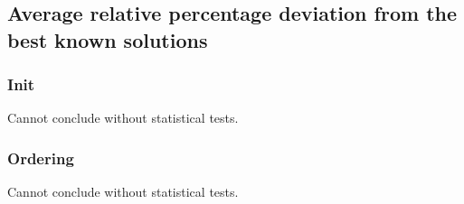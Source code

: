 \subsection{Average relative percentage deviation from the best known solutions}

\subsubsection{Init}

Cannot conclude without statistical tests.

\subsubsection{Ordering}

Cannot conclude without statistical tests.
